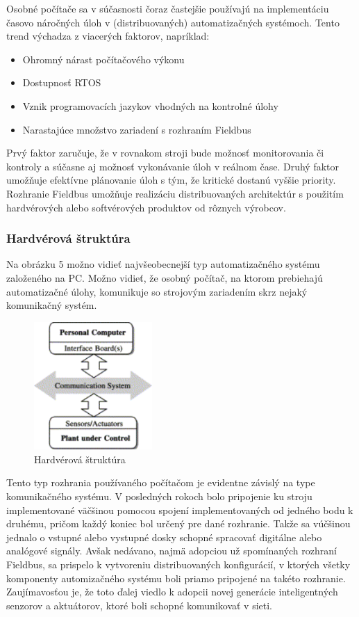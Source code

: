 \documentclass[twoside,slovak, a4paper]{article}
\begin{document}
Osobné počítače sa v súčasnosti čoraz častejšie používajú na implementáciu časovo náročných úloh v (distribuovaných) automatizačných systémoch\cite{VITTURI2004145}. Tento trend výchadza z viacerých faktorov, napríklad:

\begin{itemize}
    \item Ohromný nárast počítačového výkonu
    \item Dostupnosť RTOS
    \item Vznik programovacích jazykov vhodných na kontrolné úlohy
    \item Narastajúce množstvo zariadení s rozhraním Fieldbus
\end{itemize}

Prvý faktor zaručuje, že v rovnakom stroji bude možnosť monitorovania či kontroly a súčasne aj možnosť vykonávanie úloh v reálnom čase. Druhý faktor umožňuje efektívne plánovanie úloh s tým, že kritické dostanú vyššie priority. Rozhranie Fieldbus umožňuje realizáciu distribuovaných architektúr s použitím hardvérových alebo softvérových produktov od rôznych výrobcov.\cite{VITTURI2004145}

\subsubsection*{Hardvérová štruktúra}

Na obrázku 5 možno vidieť najvšeobecnejší typ automatizačného systému založeného na PC. Možno vidieť, že osobný počítač, na ktorom prebiehajú automatizačné úlohy, komunikuje so strojovým zariadením skrz nejaký komunikačný systém.

\begin{figure}[tbh]
  \centering
  \includegraphics[width=0.4\textwidth]{pics/hardware_structure.png}
  \caption{Hardvérová štruktúra\cite{VITTURI2004145}}
  \label{fig:4}
\end{figure}

Tento typ rozhrania používaného počítačom je evidentne závislý na type komunikačného systému. V posledných rokoch bolo pripojenie ku stroju implementované väčšinou pomocou spojení implementovaných od jedného bodu k druhému, pričom každý koniec bol určený pre dané rozhranie. Takže sa vúčšinou jednalo o vstupné alebo vystupné dosky schopné spracovať digitálne alebo analógové signály. Avšak nedávano, najmä adopciou už spomínaných rozhraní Fieldbus, sa prispelo k vytvoreniu distribuovaných konfigurácií, v ktorých všetky komponenty automizačného systému boli priamo pripojené na takéto rozhranie. Zaujímavosťou je, že toto ďalej viedlo k adopcii novej generácie inteligentných senzorov a aktuátorov, ktoré boli schopné komunikovať v sieti.\cite{VITTURI2004145}
\end{document}
